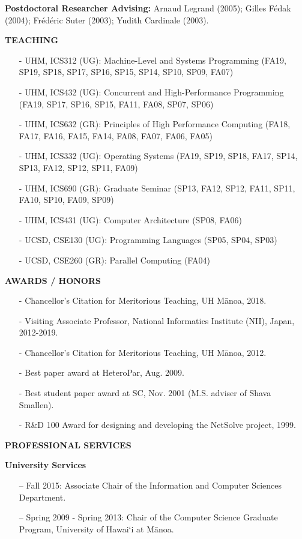 \documentclass[times,11pt]{letter}
\begin{document}
\noindent
{\bf Postdoctoral Researcher Advising:}
 Arnaud Legrand (2005);
 Gilles F\'edak (2004);
 Fr\'ed\'eric Suter (2003);
 Yudith Cardinale (2003).


\noindent
{\large{\bf TEACHING}}


\begin{itemize}
\item [-] UHM, ICS312 (UG): Machine-Level and Systems Programming (FA19,  SP19, SP18, SP17, SP16, SP15, SP14, SP10, SP09, FA07)
\item [-] UHM, ICS432 (UG): Concurrent and High-Performance Programming (FA19,  SP17, SP16, SP15, FA11, FA08, SP07, SP06)
\item [-] UHM, ICS632 (GR): Principles of High Performance Computing (FA18, FA17, FA16, FA15, FA14, FA08, FA07, FA06, FA05)
\item [-] UHM, ICS332 (UG): Operating Systems (FA19, SP19, SP18, FA17, SP14, SP13, FA12, SP12, SP11, FA09)
\item [-] UHM, ICS690 (GR): Graduate Seminar (SP13, FA12, SP12, FA11, SP11, FA10, SP10, FA09, SP09)
\item [-] UHM, ICS431 (UG): Computer Architecture (SP08, FA06)
\item [-] UCSD, CSE130 (UG): Programming Languages (SP05, SP04, SP03)
\item [-] UCSD, CSE260 (GR): Parallel Computing (FA04)
\end{itemize}

\noindent
{\large{\bf AWARDS / HONORS}}
\begin{itemize}
\item[-] Chancellor's Citation for Meritorious Teaching, UH M\=anoa, 2018.
\item[-] Visiting Associate Professor, National Informatics Institute (NII), Japan, 2012-2019.
\item[-] Chancellor's Citation for Meritorious Teaching, UH M\=anoa, 2012.
\item[-] Best paper award at HeteroPar, Aug. 2009.
\item[-] Best student paper award at SC, Nov. 2001 (M.S. adviser of Shava Smallen).
\item[-] R\&D 100 Award for designing and developing the NetSolve project, 1999.
\end{itemize}

\noindent
{\large\bf{PROFESSIONAL SERVICES}}

\noindent
{\bf University Services}
\begin{itemize}
\item [--] Fall 2015: Associate Chair of the Information and Computer Sciences Department. 
\item [--] Spring 2009 - Spring 2013: Chair of the Computer Science Graduate Program, University of Hawai`i at M\=anoa.
\end{itemize}
\end{document}
